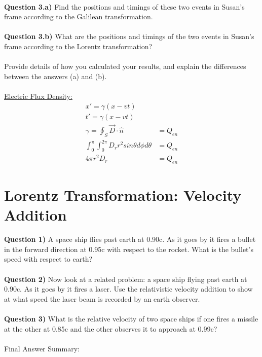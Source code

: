 \documentclass[12pt]{article}
\begin{document}
\\
\noindent \textbf{Question 3.a)} Find the positions and timings of these two events in Susan’s frame according to the Galilean transformation.\\
\\
\noindent \textbf{Question 3.b)} What are the positions and timings of the two events in Susan’s frame according to the Lorentz transformation?\\
\\
Provide details of how you calculated your results, and explain the differences between the answers (a) and (b).\\
\\
\underline{Electric Flux Density:}
	\begin{align*}
		{x}'=\gamma (x-vt)\\
		{t}'=\gamma (x-vt)\\
		{\gamma}= 
		\oint_S \vec{D} \cdot \hat{n} &= Q_{en} \\
		\int_0^\pi \int_0^{2\pi} D_r r^2 sin\theta d\phi d\theta &= Q_{en}\\	
		4\pi r^2 D_r &= Q_{en}
	\end{align*}

\section{Lorentz Transformation: Velocity Addition}
\noindent \textbf{Question 1)} A space ship flies past earth at 0.90c. As it goes by it fires a bullet in the forward
direction at 0.95c with respect to the rocket. What is the bullet’s speed with respect
to earth?\\
\\
\noindent \textbf{Question 2)} Now look at a related problem: a space ship flying past earth at 0.90c. As it goes
by it fires a laser. Use the relativistic velocity addition to show at what speed the
laser beam is recorded by an earth observer.\\
\\
\noindent \textbf{Question 3)} What is the relative velocity of two space ships if one fires a missile at the other
at 0.85c and the other observes it to approach at 0.99c?\\
\\

	
Final Answer Summary:
		
\end{document}
